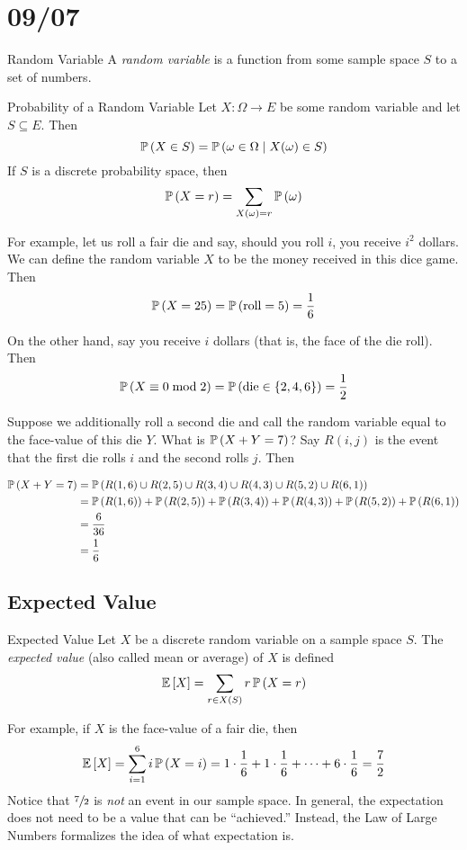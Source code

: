 \section{09/07}
\begin{definition}{Random Variable}{}
    A \emph{random variable} is a function from some sample space $S$ to a set
    of numbers.
\end{definition}

\begin{definition}{Probability of a Random Variable}{}
    Let $X:\Omega \to E$ be some random variable and let $S \subseteq E$. Then
    \[\operatorname{\mathbb{P}}\left(X \in S\right) = \operatorname{\mathbb{P}}\left(\omega \in \Omega \mid X(\omega) \in S\right)\]
    If $S$ is a discrete probability space, then
    \[\operatorname{\mathbb{P}}\left(X = r\right) = \sum_{X(\omega) = r}\operatorname{\mathbb{P}}\left(\omega\right)\]
\end{definition}

For example, let us roll a fair die and say, should you roll $i$, you receive
$i^2$ dollars. We can define the random variable $X$ to be the money received in
this dice game. Then
\[\operatorname{\mathbb{P}}\left(X = 25\right) = \operatorname{\mathbb{P}}\left(\text{roll} = 5\right) = \frac{1}{6}\]

On the other hand, say you receive $i$ dollars (that is, the face of the die
roll). Then
\[\operatorname{\mathbb{P}}\left(X \equiv 0 \bmod{2}\right) = \operatorname{\mathbb{P}}\left(\text{die} \in \left\lbrace2, 4, 6\right\rbrace\right) = \frac{1}{2}\]

Suppose we additionally roll a second die and call the random variable equal to
the face-value of this die $Y$. What is $\operatorname{\mathbb{P}}\left(X + Y = 7\right)$? Say $R(i, j)$ is the
event that the first die rolls $i$ and the second rolls $j$. Then

\begin{align*}
    \operatorname{\mathbb{P}}\left(X + Y = 7\right) &= \operatorname{\mathbb{P}}\left(R(1, 6) \cup R(2, 5) \cup R(3, 4) \cup R(4, 3) \cup R(5, 2) \cup R(6, 1)\right)\\
                    &= \operatorname{\mathbb{P}}\left(R(1, 6)\right) + \operatorname{\mathbb{P}}\left(R(2, 5)\right) + \operatorname{\mathbb{P}}\left(R(3, 4)\right) + \operatorname{\mathbb{P}}\left(R(4, 3)\right) + \operatorname{\mathbb{P}}\left(R(5, 2)\right) + \operatorname{\mathbb{P}}\left(R(6, 1)\right)\\
                    &= \frac{6}{36}\\
                    &= \frac{1}{6}
\end{align*}

\subsection{Expected Value}
\begin{definition}{Expected Value}{}
    Let $X$ be a discrete random variable on a sample space $S$. The
    \emph{expected value} (also called mean or average) of $X$ is defined
    \[\operatorname{\mathbb{E}}\left[X\right] = \sum_{r\in X(S)}r\operatorname{\mathbb{P}}\left(X = r\right)\]
\end{definition}
For example, if $X$ is the face-value of a fair die, then
\[\operatorname{\mathbb{E}}\left[X\right] = \sum_{i=1}^6i\operatorname{\mathbb{P}}\left(X = i\right) = 1\cdot\frac{1}{6} + 1\cdot\frac{1}{6} + \dots + 6\cdot\frac{1}{6} = \frac{7}{2}\]
Notice that $\sfrac{7}{2}$ is \emph{not} an event in our sample space. In
general, the expectation does not need to be a value that can be ``achieved.''
Instead, the Law of Large Numbers formalizes the idea of what expectation is.

